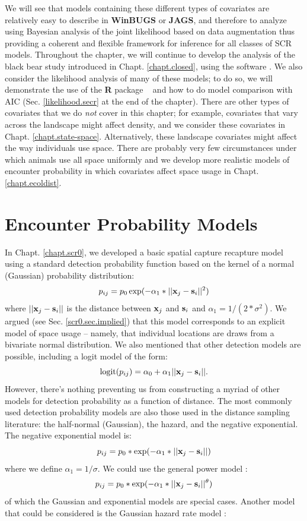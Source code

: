 We will see that models containing these different types of
covariates are relatively easy to describe in {\bf WinBUGS} or
{\bf JAGS}, and
therefore to analyze using Bayesian analysis of the joint likelihood
based on data augmentation thus providing a coherent and flexible
framework for inference for all classes of SCR models.  Throughout the
chapter, we will continue to develop the analysis of the black bear
study introduced in Chapt. \ref{chapt.closed}, using the software
\jags.  We also
consider the likelihood analysis of many of these models; to do so, we
will demonstrate the use of the {\bf R} package \secr~ and how to do model
comparison with AIC (Sec. \ref{likelihood.secr} at the end of the chapter).
There are other types of covariates that we do {\it not} cover in this
chapter; for example, covariates that vary across the
landscape might affect density, and we consider these covariates in
Chapt. \ref{chapt.state-space}.
Alternatively, these landscape covariates might affect the way individuals use
space. There are probably very few circumstances under which animals use all 
space uniformly and we develop more realistic models of encounter
probability in which covariates affect space usage in Chapt. \ref{chapt.ecoldist}.


\section{Encounter Probability Models}
\label{covs.sec.detfunc}

In Chapt. \ref{chapt.scr0}, we developed a basic spatial capture
recapture model using a standard detection probability function based on the kernel
of a normal (Gaussian) probability distribution:
\[
p_{ij} = p_{0} \exp(-\alpha_{1} *||{\bf x}_{j}-{\bf s}_{i}||^2)
\]
where $||{\bf x}_{j}-{\bf s}_{i}||$ is the distance between ${\bf
  x}_{j}$ and ${\bf s}_{i}$ and
$\alpha_{1} = 1/(2*\sigma^2)$.
We argued (see Sec. \ref{scr0.sec.implied}) that this model corresponds to
an explicit model of space usage -- namely, that individual locations
are draws from a bivariate normal distribution. We also mentioned that
other detection models are possible, including a logit model of the
form:
\begin{equation}
	\mbox{logit}(p_{ij}) = \alpha_{0} + \alpha_1 ||{\bf x}_{j}-{\bf s}_{i} ||.
\label{covariates.eq.logit}
\end{equation}
However, there's nothing preventing us from constructing a myriad of
other models for detection probability as a function of distance.
The most
commonly used detection probability models
 are also those used in the distance
sampling literature: the half-normal (Gaussian), the hazard, and the negative
exponential.  The negative exponential model is: 
\[
p_{ij} = p_{0}*\exp(-\alpha_{1} *||{\bf x}_{j}-{\bf s}_{i}||)
\]
where we define
$\alpha_{1} = 1/\sigma$.
We could use the general power model \citep{russell_etal:2012}: 
\[
p_{ij} = p_0*\exp(-\alpha_{1} *||{\bf x}_{j}-{\bf s}_{i}||^{\theta} )
\]
of which the
Gaussian and exponential models are special cases.  Another model that
could be considered is the Gaussian hazard rate model \citep{hayes_buckland:1983}:

